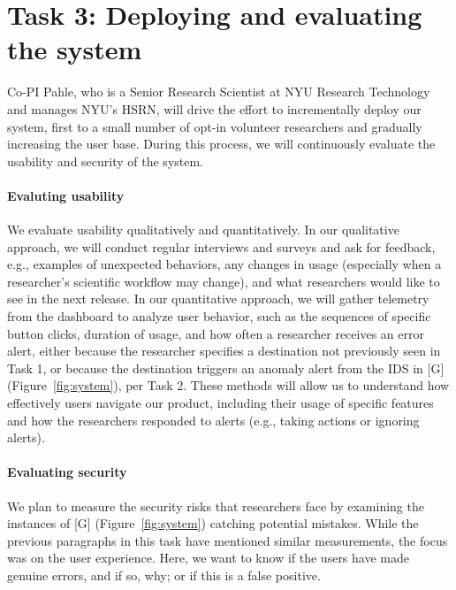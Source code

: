 \section{Task 3: Deploying and evaluating the system}

Co-PI Pahle, who is a Senior Research Scientist at NYU Research Technology and manages NYU's HSRN, will drive the effort to incrementally deploy our system, first to a small number of opt-in volunteer researchers and gradually increasing the user base. During this process, we will continuously evaluate the usability and security of the system.

\paragraph{Evaluting usability}
We evaluate usability qualitatively and quantitatively. In our qualitative approach, we will conduct regular interviews and surveys and ask for feedback, e.g., examples of unexpected behaviors, any changes in usage (especially when a researcher's scientific workflow may change), and what researchers would like to see in the next release.
In our quantitative approach, we will gather telemetry from the dashboard to analyze user behavior, such as the sequences of specific button clicks, duration of usage, and how often a researcher receives an error alert, either because the researcher specifies a destination not previously seen in Task 1, or because the destination triggers an anomaly alert from the IDS in [G] (Figure~\ref{fig:system}), per Task 2.
These methods will allow us to understand how effectively users navigate our product, including their usage of specific features and how the researchers responded to alerts (e.g., taking actions or ignoring alerts).




\paragraph{Evaluating security}
We plan to measure the security risks that researchers face by examining the instances of [G] (Figure~\ref{fig:system}) catching potential mistakes. While the previous paragraphs in this task have mentioned similar measurements, the focus was on the user experience. Here, we want to know if the users have made genuine errors, and if so, why; or if this is a false positive.

